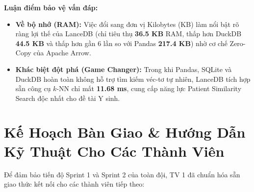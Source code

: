 \documentclass[11pt,a4paper]{article}
\begin{document}
\noindent \textbf{Luận điểm bảo vệ vấn đáp:}
\begin{itemize}
    \item \textbf{Về bộ nhớ (RAM):} Việc đổi sang đơn vị Kilobytes (KB) làm nổi bật rõ ràng lợi thế của LanceDB (chỉ tiêu thụ \textbf{36.5 KB} RAM, thấp hơn DuckDB \textbf{44.5 KB} và thấp hơn gần $6$ lần so với Pandas \textbf{217.4 KB}) nhờ cơ chế Zero-Copy của Apache Arrow.
    \item \textbf{Khác biệt đột phá (Game Changer):} Trong khi Pandas, SQLite và DuckDB hoàn toàn không hỗ trợ tìm kiếm véc-tơ tự nhiên, LanceDB tích hợp sẵn công cụ $k$-NN chỉ mất \textbf{11.68 ms}, cung cấp năng lực Patient Similarity Search độc nhất cho đề tài Y sinh.
\end{itemize}

\section{Kế Hoạch Bàn Giao & Hướng Dẫn Kỹ Thuật Cho Các Thành Viên}

Để đảm bảo tiến độ Sprint 1 và Sprint 2 của toàn đội, TV 1 đã chuẩn hóa sẵn giao thức kết nối cho các thành viên tiếp theo:
\end{document}
